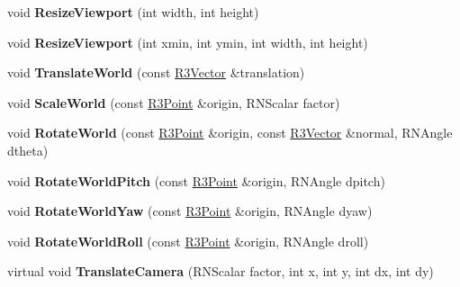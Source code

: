 \begin{DoxyCompactItemize}
\item 
void {\bfseries Resize\+Viewport} (int width, int height)\hypertarget{class_r3_viewer_ab0580fd379db2294aeb7ec18ebbc6d4c}{}\label{class_r3_viewer_ab0580fd379db2294aeb7ec18ebbc6d4c}

\item 
void {\bfseries Resize\+Viewport} (int xmin, int ymin, int width, int height)\hypertarget{class_r3_viewer_a9ad506c1b2e0fdf15364a171393d834e}{}\label{class_r3_viewer_a9ad506c1b2e0fdf15364a171393d834e}

\item 
void {\bfseries Translate\+World} (const \hyperlink{class_r3_vector}{R3\+Vector} \&translation)\hypertarget{class_r3_viewer_afa34073804e75616dea1197ccf98e2ea}{}\label{class_r3_viewer_afa34073804e75616dea1197ccf98e2ea}

\item 
void {\bfseries Scale\+World} (const \hyperlink{class_r3_point}{R3\+Point} \&origin, R\+N\+Scalar factor)\hypertarget{class_r3_viewer_a141b3d526b0cb40f3e664dd5dfb8e694}{}\label{class_r3_viewer_a141b3d526b0cb40f3e664dd5dfb8e694}

\item 
void {\bfseries Rotate\+World} (const \hyperlink{class_r3_point}{R3\+Point} \&origin, const \hyperlink{class_r3_vector}{R3\+Vector} \&normal, R\+N\+Angle dtheta)\hypertarget{class_r3_viewer_a72dd38e668ec0496e716534eb31b9325}{}\label{class_r3_viewer_a72dd38e668ec0496e716534eb31b9325}

\item 
void {\bfseries Rotate\+World\+Pitch} (const \hyperlink{class_r3_point}{R3\+Point} \&origin, R\+N\+Angle dpitch)\hypertarget{class_r3_viewer_a483431b86dadec7b23014c9da25304a9}{}\label{class_r3_viewer_a483431b86dadec7b23014c9da25304a9}

\item 
void {\bfseries Rotate\+World\+Yaw} (const \hyperlink{class_r3_point}{R3\+Point} \&origin, R\+N\+Angle dyaw)\hypertarget{class_r3_viewer_ad2acd9522f0454fb22029fbb465ca768}{}\label{class_r3_viewer_ad2acd9522f0454fb22029fbb465ca768}

\item 
void {\bfseries Rotate\+World\+Roll} (const \hyperlink{class_r3_point}{R3\+Point} \&origin, R\+N\+Angle droll)\hypertarget{class_r3_viewer_a5344001551ba2871d3874e82ab71303f}{}\label{class_r3_viewer_a5344001551ba2871d3874e82ab71303f}

\item 
virtual void {\bfseries Translate\+Camera} (R\+N\+Scalar factor, int x, int y, int dx, int dy)\hypertarget{class_r3_viewer_a3086051a9a3f0f44cc10bbcedf52422d}{}\label{class_r3_viewer_a3086051a9a3f0f44cc10bbcedf52422d}


\end{DoxyCompactItemize}

